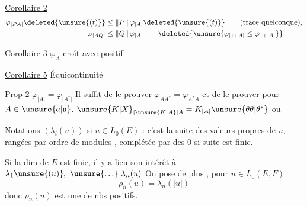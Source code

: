 \uline{Corollaire 2}
\[
\begin{aligned}
\varphi_{\lvert PA\rvert}\deleted{\unsure{(t)}}&\leq\lVert P\rVert\,\varphi_{\lvert A\rvert}\deleted{\unsure{(t)}}\qquad\text{(trace quelconque),}\\
\varphi_{\lvert AQ\rvert}&\leq\lVert Q\rVert\,\varphi_{\lvert A\rvert}\qquad\deleted{\unsure{\varphi_{\lvert1+A\rvert}\leq\varphi_{1+\lvert A\rvert}}}
\end{aligned}
\]

\uline{Corollaire 3} $\varphi_A$ croît avec  positif  

 \uline{Corollaire 5} Équicontinuité  

\uline{Prop} 2 $\varphi_{\lvert A\rvert}=\varphi_{\lvert A^*\rvert}$ Il suffit de le prouver  $\varphi_{AA^*}=\varphi_{A^*A}$ et de le prouver pour $A\in\unsure{a|\mathfrak a}$.   $\unsure{K|X}_{\lvert\unsure{K|A}\rvert A} = K_{\lvert A\rvert}\unsure{\theta\theta|\theta^*}$ ou \unsure{$\int$} 


Notations $(\lambda_i(u))$ si $u\in L_0(E)$ : c'est la suite des valeurs  propres  de $u$, rangées par ordre de modules  , complétée par des $0$ si  suite est finie.

Si la dim de $E$ est finie,  il y a lieu   son intérêt  à $\lambda_1\unsure{(u)},\ \unsure{\ldots}\ \lambda_n(u)$  On pose de plus  , pour $u\in L_0(E,F)$
\[
\boxed{\boxed{\rho_n(u)=\lambda_n(\lvert u\rvert)}}
\]
donc $\rho_n(u)$ est une   de nbs positifs.

